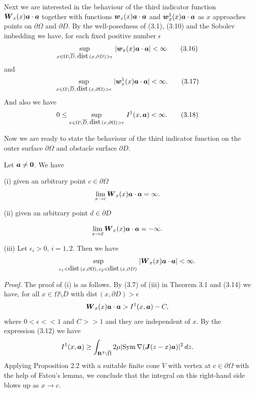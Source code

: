  
Next we are interested in the behaviour of the third indicator function $\mbox{\boldmath $W$}_x(x)\mbox{\boldmath $a$}\cdot\mbox{\boldmath $a$}$ together with functions 
$\mbox{\boldmath $w$}_x(x)
\mbox{\boldmath $a$}\cdot\mbox{\boldmath $a$}$ and $\mbox{\boldmath $w$}_x^1(x)
\mbox{\boldmath $a$}\cdot\mbox{\boldmath $a$}$ as $x$ approaches points on $\partial\Omega$ and $\partial D$.
By the well-posedness of (3.1), (3.10) and the Sobolev imbedding we have, for each fixed positive number $\epsilon$
 $$\displaystyle
 \sup_{x\in\Omega\setminus\overline{D},\,\text{dist}\,(x,\partial D)>\epsilon}\,\vert \mbox{\boldmath $w$}_x(x)\mbox{\boldmath $a$}
 \cdot\mbox{\boldmath $a$}\vert<\infty
 \tag {3.16}
 $$
 and
 $$\displaystyle
 \sup_{x\in\Omega\setminus\overline{D},\,\text{dist}\,(x,\partial\Omega)>\epsilon}\,\vert \mbox{\boldmath $w$}_x^1(x)
 \mbox{\boldmath $a$}\cdot\mbox{\boldmath $a$}\vert<\infty.
 \tag {3.17}
 $$
 And also we have
 $$\displaystyle
 0\le\sup_{x\in\Omega\setminus\overline{D},\,\text{dist}\,(x,\partial\Omega)>\epsilon}
 \,I^1(x,\mbox{\boldmath $a$})<\infty.
 \tag {3.18}
 $$
 

 Now we are ready to state the behaviour of the third indicator function on the outer surface $\partial\Omega$ and 
 obstacle surface $\partial D$.


 Let $\mbox{\boldmath $a$}\not=\mbox{\boldmath $0$}$.
 We have
 
 
 \noindent
 (i)  given an arbitrary point $c\in\partial\Omega$ 
 $$\displaystyle
 \lim_{x\rightarrow c}\mbox{\boldmath $W$}_x(x)\mbox{\boldmath $a$}\cdot\mbox{\boldmath $a$}=\infty.
 $$
 
 
 \noindent
 (ii)   given an arbitrary point $d\in\partial D$ 
 
 
 \noindent
 $$\displaystyle
 \lim_{x\rightarrow d}\mbox{\boldmath $W$}_x(x)\mbox{\boldmath $a$}\cdot\mbox{\boldmath $a$}=-\infty.
 $$
 
 
 
 \noindent
 (iii)  Let $\epsilon_i>0$, $i=1,2$.  Then we have
 $$\displaystyle
 \sup_{\epsilon_1<\text{dist}\,(x,\partial\Omega),\,\epsilon_2<\text{dist}\,(x,\partial D)\,}
 \vert\mbox{\boldmath $W$}_x(x)\mbox{\boldmath $a$}\cdot\mbox{\boldmath $a$}\vert<\infty.
 $$

 
 
 
 \endproclaim
 
 
 
 {\it\noindent Proof.}  
 The proof of (i) is as follows.  By (3.7) of (iii) in Theorem 3.1 and (3.14)
 we have, for all $x\in\Omega\setminus\overline{D}$ with $\text{dist}\,(x,\partial D)>\epsilon$
 $$\displaystyle
 \mbox{\boldmath $W$}_x(x)\mbox{\boldmath $a$}\cdot\mbox{\boldmath $a$}
 >I^1(x,\mbox{\boldmath $a$})-C,
 $$
 where $0<\epsilon<<1$ and $C>>1$ and they are independent of $x$.
 By the expression (3.12) we have
 $$\displaystyle
 I^1(x,\mbox{\boldmath $a$})
\ge \int_{\Bbb R^3\setminus\overline{\Omega}}
2\mu\vert\text{Sym}\,\nabla(\mbox{\boldmath $J$}(z-x)\mbox{\boldmath $a$})\vert^2\,dz.
$$
Applying Proposition 2.2 with a suitable finite cone $V$ with vertex at $c\in\partial\Omega$
with the help of Fatou's lemma, we conclude that the integral on this right-hand side blows up
as $x\rightarrow c$.
 
